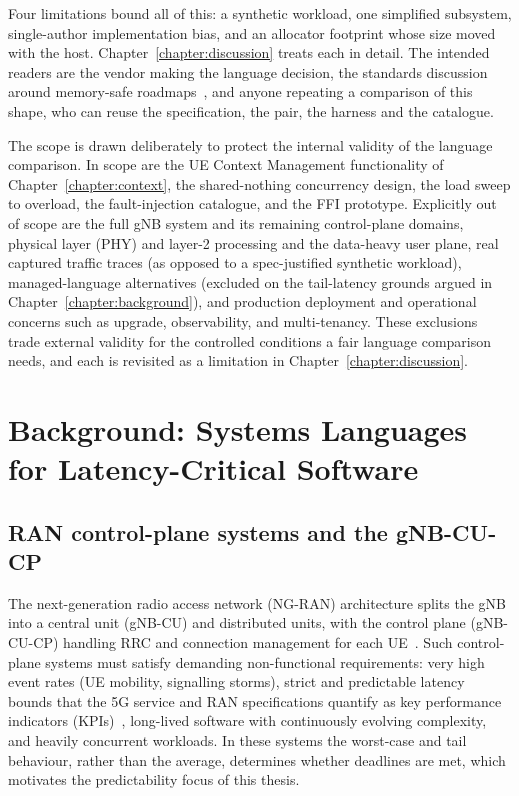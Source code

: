 \documentclass[english,oneside,a4paper,censored,csm,software-track-2020]{HYthesisML}
\begin{document}
Four limitations bound all of this: a synthetic workload, one simplified subsystem,
single-author implementation bias, and an allocator footprint whose size moved with the host.
Chapter~\ref{chapter:discussion} treats each in detail. The intended readers are the vendor
making the language decision, the standards discussion around memory-safe
roadmaps~\cite{cisa2023memorysafe,oncd2024building}, and anyone repeating a comparison of this
shape, who can reuse the specification, the pair, the harness and the catalogue.

The scope is drawn deliberately to protect the internal validity of the language comparison. In
scope are the UE Context Management functionality of Chapter~\ref{chapter:context}, the
shared-nothing concurrency design, the load sweep to overload, the fault-injection catalogue,
and the FFI prototype. Explicitly out of scope are the full gNB system and its remaining
control-plane domains, physical layer (PHY) and layer-2 processing and the data-heavy user
plane, real captured traffic
traces (as opposed to a spec-justified synthetic workload), managed-language alternatives
(excluded on the tail-latency grounds argued in Chapter~\ref{chapter:background}), and
production deployment and operational concerns such as upgrade, observability, and
multi-tenancy. These exclusions trade external validity for the controlled conditions a fair
language comparison needs, and each is revisited as a limitation in
Chapter~\ref{chapter:discussion}.

\chapter{Background: Systems Languages for Latency-Critical Software\label{chapter:background}}

\section{RAN control-plane systems and the gNB-CU-CP}\label{sec:ranarch}
The next-generation radio access network (NG-RAN) architecture splits the gNB into a central
unit (gNB-CU) and distributed units, with the control plane (gNB-CU-CP) handling RRC and
connection management for each UE~\cite{3gpp38401,3gpp38300,3gpp38331}. Such control-plane
systems must satisfy demanding non-functional requirements: very high event rates (UE
mobility, signalling storms), strict and predictable latency bounds that the 5G service and
RAN specifications quantify as key performance indicators
(KPIs)~\cite{3gpp38913,3gpp22261}, long-lived software with continuously evolving complexity,
and heavily concurrent workloads. In these systems the worst-case and tail behaviour,
rather than the average, determines whether deadlines are met, which motivates the
predictability focus of this thesis.
\end{document}
